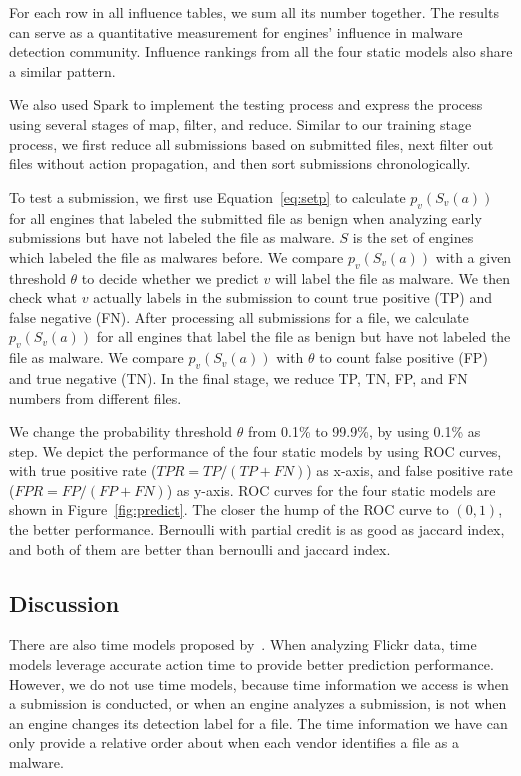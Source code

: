 For each row in all influence tables, we sum all its number together. 
The results can serve as a quantitative measurement for engines' influence in malware detection community. 
Influence rankings from all the four static models also share a similar pattern. 

We also used Spark to implement the testing process and express the process using several stages of map, filter, and reduce.
Similar to our training stage process, 
we first reduce all submissions based on submitted files,
next filter out files without action propagation, 
and then sort submissions chronologically. 

To test a submission, we first use Equation~\ref{eq:setp} to
calculate $p_v(S_v(a))$ for all engines
that labeled the submitted file as benign when analyzing early submissions 
but have not labeled the file as malware. 
$S$ is the set of engines which labeled the file as malwares before.
We compare $p_v(S_v(a))$ with a given threshold $\theta$ to decide whether we predict 
$v$ will label the file as malware.
We then check what $v$ actually labels in the submission to count true positive (TP) and false negative (FN). 
After processing all submissions for a file, 
we calculate $p_v(S_v(a))$ for all engines  
that label the file as benign but have not labeled the file as malware.
We compare $p_v(S_v(a))$ with $\theta$ to count false positive (FP) and true negative (TN).
In the final stage, we reduce TP, TN, FP, and FN numbers from different files.



We change the probability threshold $\theta$ from 0.1\% to 99.9\%, 
by using 0.1\% as step. 
We depict the performance of the four static models by using ROC curves, 
with true positive rate ($TPR = TP/(TP+FN)$) as x-axis, 
and false positive rate ($FPR = FP/(FP + FN)$) as y-axis. 
ROC curves for the four static models are shown in Figure~\ref{fig:predict}. 
The closer the hump of the ROC curve to $(0,1)$, the better performance.
Bernoulli with partial credit is as good as jaccard index, 
and both of them are better than bernoulli and jaccard index. 


\subsection{Discussion}

There are also time models proposed by~\citet{Influence}.
When analyzing Flickr data, time models leverage accurate action time to provide better prediction performance. 
However, we do not use time models, 
because time information we access is when a submission is conducted, 
or when an engine analyzes a submission, 
is not when an engine changes its detection label for a file.
The time information we have can only provide a relative order about when each vendor identifies a file as a malware.  

